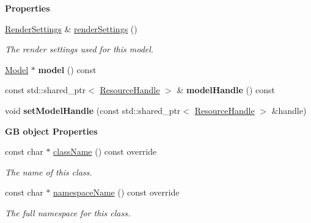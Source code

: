 \begin{Indent}\textbf{ Properties}\par
\begin{DoxyCompactItemize}
\item 
\mbox{\label{classrev_1_1_model_component_a5955b1688cb6a973a113d48fabdb6b36}} 
\mbox{\hyperlink{classrev_1_1_render_settings}{Render\+Settings}} \& \mbox{\hyperlink{classrev_1_1_model_component_a5955b1688cb6a973a113d48fabdb6b36}{render\+Settings}} ()
\begin{DoxyCompactList}\small\item\em The render settings used for this model. \end{DoxyCompactList}\item 
\mbox{\label{classrev_1_1_model_component_a04c6794b3c34b0d6aedfe5e38b8ca3ff}} 
\mbox{\hyperlink{classrev_1_1_model}{Model}} $\ast$ {\bfseries model} () const
\item 
\mbox{\label{classrev_1_1_model_component_a1cb5803316eec7740c801e22681d8a6b}} 
const std\+::shared\+\_\+ptr$<$ \mbox{\hyperlink{classrev_1_1_resource_handle}{Resource\+Handle}} $>$ \& {\bfseries model\+Handle} () const
\item 
\mbox{\label{classrev_1_1_model_component_ad90243abe1eddc24c7be6094e3805621}} 
void {\bfseries set\+Model\+Handle} (const std\+::shared\+\_\+ptr$<$ \mbox{\hyperlink{classrev_1_1_resource_handle}{Resource\+Handle}} $>$ \&handle)
\end{DoxyCompactItemize}
\end{Indent}
\begin{Indent}\textbf{ GB object Properties}\par
\begin{DoxyCompactItemize}
\item 
const char $\ast$ \mbox{\hyperlink{classrev_1_1_model_component_a31298d9d0fb5d7e43cbe6de3050d4f6a}{class\+Name}} () const override
\begin{DoxyCompactList}\small\item\em The name of this class. \end{DoxyCompactList}\item 
const char $\ast$ \mbox{\hyperlink{classrev_1_1_model_component_ad55fe767e54742f08b338f0f13498cf8}{namespace\+Name}} () const override
\begin{DoxyCompactList}\small\item\em The full namespace for this class. \end{DoxyCompactList}\end{DoxyCompactItemize}
\end{Indent}
